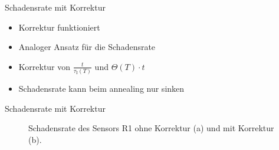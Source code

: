 \documentclass[aspectratio=1610, 9pt]{beamer}
\begin{document}
\begin{frame}{Schadensrate mit Korrektur}
  \begin{itemize}
    \item Korrektur funktioniert
    \medskip
    \item Analoger Ansatz für die Schadensrate
    \medskip
    \item Korrektur von $\frac{t}{\tau_{\mathrm{I}}(T)}$ und  $\Theta(T) \cdot t$
    \medskip
    \item Schadensrate kann beim annealing nur sinken
  \end{itemize}
\end{frame}

\begin{frame}{Schadensrate mit Korrektur}
  \begin{figure}
  \caption{Schadensrate des Sensors R1 ohne Korrektur (a) und mit Korrektur (b).}
  \end{figure}
\end{frame}
\end{document}
